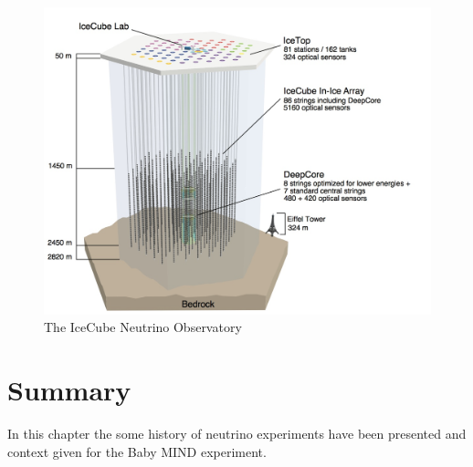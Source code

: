 \begin{figure}
\centering
\includegraphics[width=.5\textwidth]{figures/IceCube.jpeg}
\caption{The IceCube Neutrino Observatory}
\end{figure}
\fi

\section{Summary}
In this chapter the some history of neutrino experiments have been presented and context given for the Baby MIND experiment.






